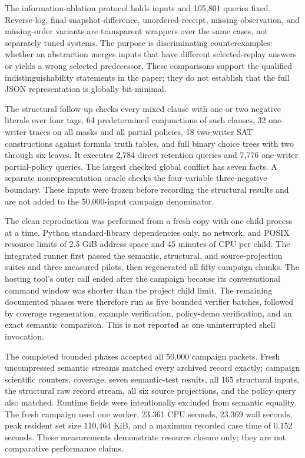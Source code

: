 The information-ablation protocol holds inputs and 105,801 queries fixed.  Reverse-log,
final-snapshot-difference, unordered-receipt, missing-observation, and missing-order
variants are transparent wrappers over the same cases, not separately tuned systems.
The purpose is discriminating counterexamples: whether an abstraction merges inputs
that have different selected-replay answers or yields a wrong selected predecessor.
These comparisons support the qualified indistinguishability statements in the paper;
they do not establish that the full JSON representation is globally bit-minimal.

The structural follow-up checks every mixed clause with one or two negative literals
over four tags, 64 predetermined conjunctions of such clauses, 32 one-writer traces on
all masks and all partial policies, 18 two-writer SAT constructions against formula
truth tables, and full binary choice trees with two through six leaves.  It executes
2,784 direct retention queries and 7,776 one-writer partial-policy queries.  The
largest checked global conflict has seven facts.  A separate nonrepresentation oracle
checks the four-variable three-negative boundary.  These inputs were frozen before
recording the structural results and are not added to the 50,000-input campaign
denominator.

The clean reproduction was performed from a fresh copy with one child process at a
time, Python standard-library dependencies only, no network, and POSIX resource limits
of 2.5 GiB address space and 45 minutes of CPU per child.  The integrated runner first
passed the semantic, structural, and source-projection suites and three measured
pilots, then regenerated all fifty campaign chunks.  The hosting tool's outer call
ended after the campaign because its conversational command window was shorter than
the project child limit.  The remaining documented phases were therefore run as five
bounded verifier batches, followed by coverage regeneration, example verification,
policy-demo verification, and an exact semantic comparison.  This is not reported as
one uninterrupted shell invocation.

The completed bounded phases accepted all 50,000 campaign packets.  Fresh uncompressed
semantic streams matched every archived record exactly; campaign scientific counters,
coverage, seven semantic-test results, all 165 structural inputs, the structural raw
record stream, all six source projections, and the policy query also matched.  Runtime
fields were intentionally excluded from semantic equality.  The fresh campaign used
one worker, 23.361 CPU seconds, 23.369 wall seconds, peak resident set size 110,464 KiB,
and a maximum recorded case time of 0.152 seconds.  These measurements demonstrate
resource closure only; they are not comparative performance claims.

